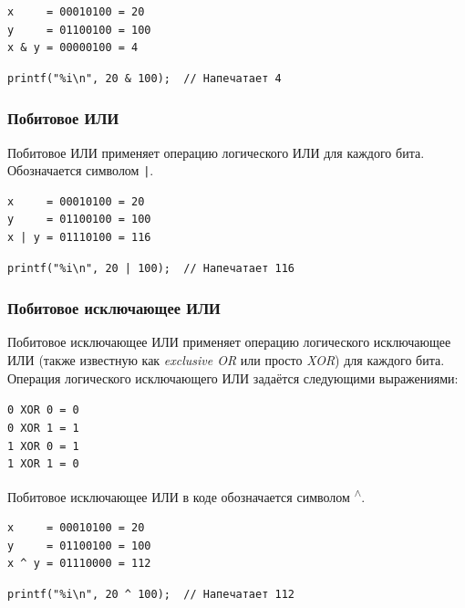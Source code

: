 \documentclass[10pt]{article}
\begin{document}
\begin{minipage}{0.35\textwidth}
\begin{verbatim}
x     = 00010100 = 20
y     = 01100100 = 100
x & y = 00000100 = 4
\end{verbatim}
\end{minipage}
\hfill
\begin{minipage}{0.55\textwidth}
\begin{lstlisting}
printf("%i\n", 20 & 100);  // Напечатает 4
\end{lstlisting}
\end{minipage}

\subsubsection*{Побитовое ИЛИ}
Побитовое ИЛИ применяет операцию логического ИЛИ для каждого бита. Обозначается символом \texttt{|}.\\

\begin{minipage}{0.35\textwidth}
\begin{verbatim}
x     = 00010100 = 20
y     = 01100100 = 100
x | y = 01110100 = 116
\end{verbatim}
\end{minipage}
\hfill
\begin{minipage}{0.55\textwidth}
\begin{lstlisting}
printf("%i\n", 20 | 100);  // Напечатает 116
\end{lstlisting}
\end{minipage}
\subsubsection*{Побитовое исключающее ИЛИ}
Побитовое исключающее ИЛИ применяет операцию логического исключающее ИЛИ (также известную как \textit{exclusive OR} или просто \textit{XOR}) для каждого бита.  Операция логического исключающего ИЛИ задаётся следующими выражениями:
\begin{center}
\texttt{0 XOR 0 = 0}\\
\texttt{0 XOR 1 = 1}\\
\texttt{1 XOR 0 = 1}\\
\texttt{1 XOR 1 = 0}\\
\end{center}
Побитовое исключающее ИЛИ в коде обозначается символом \textsuperscript{$\wedge$}.\\

\begin{minipage}{0.35\textwidth}
\begin{verbatim}
x     = 00010100 = 20
y     = 01100100 = 100
x ^ y = 01110000 = 112
\end{verbatim}
\end{minipage}
\hfill
\begin{minipage}{0.55\textwidth}
\begin{lstlisting}
printf("%i\n", 20 ^ 100);  // Напечатает 112
\end{lstlisting}
\end{minipage}
\end{document}
